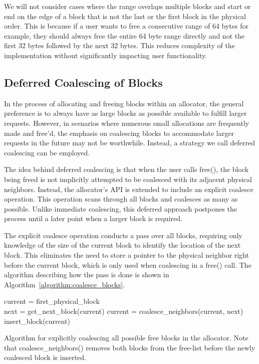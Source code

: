 We will not consider cases where the range overlaps multiple blocks and start or end on the edge of a block that is not the last or the first block in the physical order. This is because if a user wants to free a consecutive range of 64 bytes for example, they should always free the entire 64 byte range directly and not the first 32 bytes followed by the next 32 bytes. This reduces complexity of the implementation without significantly impacting user functionality.

\subsection{Deferred Coalescing of Blocks}

In the process of allocating and freeing blocks within an allocator, the general preference is to always have as large blocks as possible available to fulfill larger requests. However, in scenarios where numerous small allocations are frequently made and free'd, the emphasis on coalescing blocks to accommodate larger requests in the future may not be worthwhile. Instead, a strategy we call deferred coalescing can be employed.

The idea behind deferred coalescing is that when the user calls free(), the block being freed is not implicitly attempted to be coalesced with its adjacent physical neighbors. Instead, the allocator's API is extended to include an explicit coalesce operation. This operation scans through all blocks and coalesces as many as possible. Unlike immediate coalescing, this deferred approach postpones the process until a later point when a larger block is required.

The explicit coalesce operation conducts a pass over all blocks, requiring only knowledge of the size of the current block to identify the location of the next block. This eliminates the need to store a pointer to the physical neighbor right before the current block, which is only used when coalescing in a free() call. The algorithm describing how the pass is done is shown in Algorithm~\ref{algorithm:coalesce_blocks}.

\begin{algorithm}[H]
current = first\_physical\_block\\
 {
next = get\_next\_block(current)\;
 {
    current = coalesce\_neighbors(current, next)\;
    insert\_block(current)\;
}
}
\label{algorithm:coalesce_blocks}
\caption{Algorithm for explicitly coalescing all possible free blocks in the allocator. Note that coalesce\_neighbors() removes both blocks from the free-list before the newly coalesced block is inserted.}
\end{algorithm}

